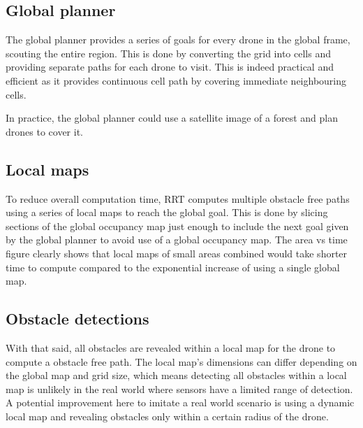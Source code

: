  
\subsection{Global planner}

The global planner provides a series of goals for every drone in the global frame, scouting the entire region. This is done by converting the grid into cells and providing separate paths for each drone to visit. This is indeed practical and efficient as it provides continuous cell path by covering immediate neighbouring cells.

In practice, the global planner could use a satellite image of a forest and plan drones to cover it. 


\subsection{Local maps}

To reduce overall computation time, RRT computes multiple obstacle free paths
using a series of local maps to reach the global goal. This is done by slicing sections of the global occupancy map just enough to include the next goal given by the global planner to avoid use of a global occupancy map. The area vs time figure clearly shows that local maps of small areas combined would take shorter time to compute compared to the exponential increase of using a single global map.

\subsection{Obstacle detections}
With that said, all obstacles are revealed within a local map for the drone to compute a obstacle free path. The local map's dimensions can differ depending on the global map and grid size, which means detecting all obstacles within a local map is unlikely in the real world where sensors have a limited range of detection. \\
 A potential improvement here to imitate a real world scenario is using a dynamic local map and revealing obstacles only within a certain radius of the drone.

